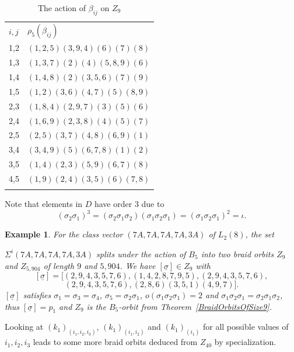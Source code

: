 \documentclass[12pt,a4paper]{article}
\newtheorem{example}{Example}[section]
\numberwithin{equation}{section}
\numberwithin{table}{section}
\begin{document}
\begin{table}[!htbp]
\centering
\footnotesize
\captionsetup{font=footnotesize}
\caption{The action of $\beta_{ij}$ on $Z_9$}
\label{tab:PermutationRepresentationOnZ9Betaij}
\begin{tabular}{ll}
\hline\noalign{\smallskip}
$i,j$ & $\rho_5(\beta_{ij})$ \\
\noalign{\smallskip}\hline\noalign{\smallskip}
1,2   & $(1,2,5)(3,9,4)(6)(7)(8)$ \\
1,3   & $(1,3,7)(2)(4)(5,8,9)(6)$ \\
1,4   & $(1,4,8)(2)(3,5,6)(7)(9)$ \\
1,5   & $(1,2)(3,6)(4,7)(5)(8,9)$ \\
\noalign{\smallskip}\hline\noalign{\smallskip}
2,3   & $(1,8,4)(2,9,7)(3)(5)(6)$ \\
2,4   & $(1,6,9)(2,3,8)(4)(5)(7)$ \\
2,5   & $(2,5)(3,7)(4,8)(6,9)(1)$ \\
\noalign{\smallskip}\hline\noalign{\smallskip}
3,4   & $(3,4,9)(5)(6,7,8)(1)(2)$ \\
3,5   & $(1,4)(2,3)(5,9)(6,7)(8)$ \\
\noalign{\smallskip}\hline\noalign{\smallskip}
4,5   & $(1,9)(2,4)(3,5)(6)(7,8)$ \\
\noalign{\smallskip}\hline
\end{tabular}
\end{table}
%
\noindent
Note that elements in $D$ have order 3 due to 
$$(\sigma_2\sigma_1)^3 =(\sigma_2\sigma_1\sigma_2)(\sigma_1 \sigma_2\sigma_1)=(\sigma_1 \sigma_2\sigma_1)^2=\iota.$$
%
\begin{example}
\label{L2_8_7A7A7A7A3A}
For the class vector $(7A,7A,7A,7A,3A)$ of $L_2(8)$, the set
\par
\noindent
$\Sigma^i(7A,7A,7A,7A,3A)$ splits under the action of $B_5$ into
two braid orbits $Z_9$ and $Z_{5,904}$ of length $9$ and $5,904$.
We have $[\underline{\sigma}] \in Z_9$ with
$$[\underline{\sigma}]=[(2,9,4,3,5,7,6), (1,4,2,8,7,9,5), (2,9,4,3,5,7,6),$$
$$(2,9,4,3,5,7,6), (2,8,6)(3,5,1)(4,9,7)].$$
$[\underline{\sigma}]$ satisfies $\sigma_1 = \sigma_3 = \sigma_4$, $\sigma_5 = \sigma_2 \sigma_1$,
$o(\sigma_1 \sigma_2 \sigma_1 )=2$ and $\sigma_1 \sigma_2 \sigma_1 = \sigma_2 \sigma_1 \sigma_2$,
thus $[\underline{\sigma}] = p_1$ and $Z_9$ is the $B_5$-orbit from Theorem~\ref{BraidOrbitsOfSize9}.
\end{example}
%
\noindent
Looking at $(k_1)_{(i_1,i_2,i_3)}$, $(k_1)_{(i_1,i_2)}$ and $(k_1)_{(i_1)}$ for all possible 
values of $i_1, i_2, i_3$ leads to some more braid orbits deduced from $Z_{40}$ by specialization. 
\end{document}

